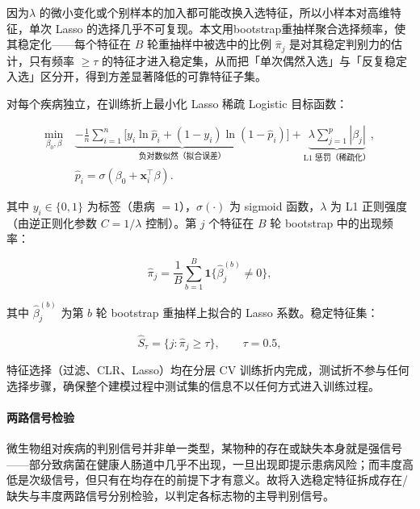 \documentclass{../../latex/templates/mcm-paper}
\begin{document}
因为$\lambda$ 的微小变化或个别样本的加入都可能改换入选特征，所以小样本对高维特征，单次 Lasso 的选择几乎不可复现。本文用bootstrap重抽样聚合选择频率，使其稳定化——每个特征在 $B$ 轮重抽样中被选中的比例 $\hat{\pi}_j$ 是对其稳定判别力的估计，只有频率 $\ge\tau$ 的特征才进入稳定集，从而把「单次偶然入选」与「反复稳定入选」区分开，得到方差显著降低的可靠特征子集。

对每个疾病独立，在训练折上最小化 Lasso 稀疏 Logistic 目标函数：

\begin{equation}
\begin{aligned}
  \min_{\beta_0,\beta}\ &
  \underbrace{-\frac{1}{n}\sum_{i=1}^{n}\Big[y_i\ln\hat{p}_i + (1-y_i)\ln(1-\hat{p}_i)\Big]}_{\text{负对数似然（拟合误差）}}
  + \underbrace{\lambda\sum_{j=1}^{p}|\beta_j|}_{\text{L1 惩罚（稀疏化）}},\\
  &\hat{p}_i = \sigma(\beta_0 + \mathbf{x}_i^{\top}\beta).
\end{aligned}
\label{eq:s2-lasso}
\end{equation}

其中 $y_i\in\{0,1\}$ 为标签（患病 $=1$），$\sigma(\cdot)$ 为 sigmoid 函数，$\lambda$ 为 L1 正则强度（由逆正则化参数 $C=1/\lambda$ 控制）。第 $j$ 个特征在 $B$ 轮 bootstrap 中的出现频率：

\begin{equation}
\hat{\pi}_j = \frac{1}{B}\sum_{b=1}^{B}\mathbf{1}\{\hat{\beta}_j^{(b)}\neq 0\},
\label{eq:s2-freq}
\end{equation}

其中 $\hat{\beta}_j^{(b)}$ 为第 $b$ 轮 bootstrap 重抽样上拟合的 Lasso 系数。稳定特征集：

\begin{equation}
\hat{S}_\tau = \big\{ j: \hat{\pi}_j \geq \tau \big\},
  \qquad
  \tau = 0.5,
\label{eq:s2-stable}
\end{equation}

特征选择（过滤、CLR、Lasso）均在分层 CV 训练折内完成，测试折不参与任何选择步骤，确保整个建模过程中测试集的信息不以任何方式进入训练过程。

\paragraph{两路信号检验}

微生物组对疾病的判别信号并非单一类型，某物种的存在或缺失本身就是强信号——部分致病菌在健康人肠道中几乎不出现，一旦出现即提示患病风险；而丰度高低是次级信号，但只有在均存在的前提下才有意义。故将入选稳定特征拆成存在/缺失与丰度两路信号分别检验，以判定各标志物的主导判别信号。
\end{document}
